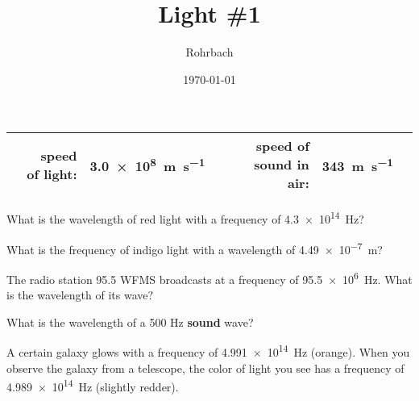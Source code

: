 \documentclass[10pt]{exam}
\title{Light \#1}
\author{Rohrbach}
\date{\today}
\begin{document}
\maketitle

\begin{center}
  \renewcommand{\arraystretch}{2}
  \begin{tabular}{|crlc|crlc|}
    \hline
     & speed of light: & \SI{3.0e8}{\meter\per\second} & &
     & speed of sound in air: & \SI{343}{\meter\per\second} &
    \\\hline
  \end{tabular}
\end{center}

\begin{questions}

\question
  What is the wavelength of red light with a frequency of \SI{4.3e14}{\hertz}?
  \vs


\question
  What is the frequency of indigo light with a wavelength of \SI{4.49e-7}{\meter}?
  \vs

\question
  The radio station 95.5 WFMS broadcasts at a frequency of \SI{95.5e6}{\hertz}.  What is the wavelength of its wave?
  \vs

\question
  What is the wavelength of a 500 Hz {\bf sound} wave?
  \vs
  
\question
  A certain galaxy glows with a frequency of \SI{4.991e14}{\hertz} (orange).  When you observe the galaxy from a telescope, the color of light you see has a frequency of \SI{4.989e14}{\hertz} (slightly redder).

  
  
  
  
  
  
  
  
  
\end{questions}
\end{document}
